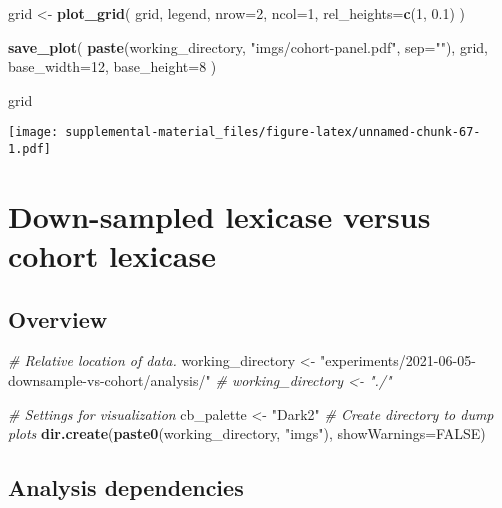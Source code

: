 \documentclass[]{book}
\newenvironment{Shaded}{\begin{snugshade}}{\end{snugshade}}
\newcommand{\CommentTok}[1]{\textcolor[rgb]{0.56,0.35,0.01}{\textit{#1}}}
\newcommand{\DataTypeTok}[1]{\textcolor[rgb]{0.13,0.29,0.53}{#1}}
\newcommand{\DecValTok}[1]{\textcolor[rgb]{0.00,0.00,0.81}{#1}}
\newcommand{\FloatTok}[1]{\textcolor[rgb]{0.00,0.00,0.81}{#1}}
\newcommand{\KeywordTok}[1]{\textcolor[rgb]{0.13,0.29,0.53}{\textbf{#1}}}
\newcommand{\NormalTok}[1]{#1}
\newcommand{\OtherTok}[1]{\textcolor[rgb]{0.56,0.35,0.01}{#1}}
\newcommand{\StringTok}[1]{\textcolor[rgb]{0.31,0.60,0.02}{#1}}
\begin{document}
\begin{Shaded}
\begin{Highlighting}[]
\NormalTok{grid <-}\StringTok{ }\KeywordTok{plot_grid}\NormalTok{(}
\NormalTok{  grid,}
\NormalTok{  legend,}
  \DataTypeTok{nrow=}\DecValTok{2}\NormalTok{,}
  \DataTypeTok{ncol=}\DecValTok{1}\NormalTok{,}
  \DataTypeTok{rel_heights=}\KeywordTok{c}\NormalTok{(}\DecValTok{1}\NormalTok{, }\FloatTok{0.1}\NormalTok{)}
\NormalTok{)}

\KeywordTok{save_plot}\NormalTok{(}
  \KeywordTok{paste}\NormalTok{(working_directory, }\StringTok{"imgs/cohort-panel.pdf"}\NormalTok{, }\DataTypeTok{sep=}\StringTok{""}\NormalTok{),}
\NormalTok{  grid,}
  \DataTypeTok{base_width=}\DecValTok{12}\NormalTok{,}
  \DataTypeTok{base_height=}\DecValTok{8}
\NormalTok{)}

\NormalTok{grid}
\end{Highlighting}
\end{Shaded}

\texttt{[image: supplemental-material\_files/figure-latex/unnamed-chunk-67-1.pdf]}

\hypertarget{down-sampled-lexicase-versus-cohort-lexicase}{%
\chapter{Down-sampled lexicase versus cohort lexicase}\label{down-sampled-lexicase-versus-cohort-lexicase}}

\hypertarget{overview-6}{%
\section{Overview}\label{overview-6}}

\begin{Shaded}
\begin{Highlighting}[]
\CommentTok{# Relative location of data.}
\NormalTok{working_directory <-}
\StringTok{  "experiments/2021-06-05-downsample-vs-cohort/analysis/"}
\CommentTok{# working_directory <- "./"}

\CommentTok{# Settings for visualization}
\NormalTok{cb_palette <-}\StringTok{ "Dark2"}
\CommentTok{# Create directory to dump plots}
\KeywordTok{dir.create}\NormalTok{(}\KeywordTok{paste0}\NormalTok{(working_directory, }\StringTok{"imgs"}\NormalTok{), }\DataTypeTok{showWarnings=}\OtherTok{FALSE}\NormalTok{)}
\end{Highlighting}
\end{Shaded}

\hypertarget{analysis-dependencies-6}{%
\section{Analysis dependencies}\label{analysis-dependencies-6}}
\end{document}
